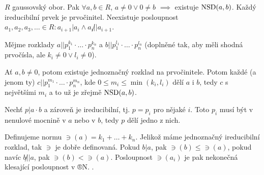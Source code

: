 \documentclass[12pt]{article}                   %
\begin{document}
        \begin{dusledek}
            $R$ gaussovský obor. Pak $\forall a, b \in R$, $a≠0 \lor 0≠b$ $\implies$ existuje $\operatorname{NSD}(a, b)$. Každý ireducibilní prvek je prvočinitel. Neexistuje posloupnost $a_1, a_2, a_3, … \in R: a_{i+1}|a_i \land a_i \not|| a_{i+1}$.

            \begin{dukazin}
                Mějme rozklady $a || p_1^{k_1}·…·p_n^{k_n}$ a $b || p_1^{l_1}·…·p_n^{l_n}$ (doplněné tak, aby měli shodná prvočísla, ale $k_i ≠ 0 \lor l_i ≠ 0$).

                Ať $a, b ≠ 0$, potom existuje jednoznačný rozklad na prvočinitele. Potom každé (a jenom ty) $c || p_1^{m_1}·…·p_n^{m_n}$, kde $0 ≤ m_i ≤ \min(k_i, l_i)$ dělí $a$ i $b$, tedy $c$ s největšími $m_i$ a to už je zřejmě $\operatorname{NSD}(a, b)$.

                Nechť $p | a·b$ a zároveň je ireducibilní, tj. $p = p_i$ pro nějaké $i$. Toto $p_i$ musí být v nenulové mocnině v $a$ nebo v $b$, tedy $p$ dělí jedno z nich.

                Definujeme normu $\ni(a) = k_1 + … + k_n$. Jelikož máme jednoznačný ireducibilní rozklad, tak $\ni$ je dobře definovaná. Pokud $b|a$, pak $\ni(b) ≤ \ni(a)$, pokud navíc $b \not || a$, pak $\ni(b) < \ni(a)$. Posloupnost $\ni(a_i)$ je pak nekonečná klesající posloupnost v ®N. \lightning. 
            \end{dukazin}
        \end{dusledek}
\end{document}
